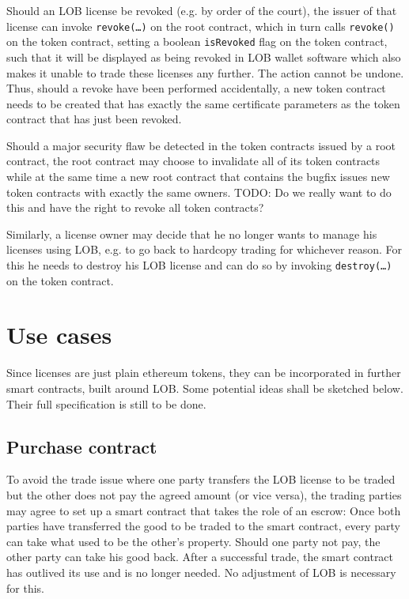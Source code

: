 \documentclass[a4paper]{article}
\newcommand{\todo}[1]{\textsf{TODO: #1}}
\begin{document}
Should an LOB license be revoked (e.g. by order of the court), the issuer of that license can invoke \texttt{revoke(…)} on the root contract, which in turn calls \texttt{revoke()} on the token contract, setting a boolean \texttt{isRevoked} flag on the token contract, such that it will be displayed as being revoked in LOB wallet software which also makes it unable to trade these licenses any further. The action cannot be undone. Thus, should a revoke have been performed accidentally, a new token contract needs to be created that has exactly the same certificate parameters as the token contract that has just been revoked.

Should a major security flaw be detected in the token contracts issued by a root contract, the root contract may choose to invalidate all of its token contracts while at the same time a new root contract that contains the bugfix issues new token contracts with exactly the same owners. \todo{Do we really want to do this and have the right to revoke all token contracts?}

Similarly, a license owner may decide that he no longer wants to manage his licenses using LOB, e.g. to go back to hardcopy trading for whichever reason. For this he needs to destroy his LOB license and can do so by invoking \texttt{destroy(…)} on the token contract.

\section{Use cases}
\label{ch:useCases}

Since licenses are just plain ethereum tokens, they can be incorporated in further smart contracts, built around LOB. Some potential ideas shall be sketched below. Their full specification is still to be done.

\subsection{Purchase contract}
\label{ch:purchaseContract}

To avoid the trade issue where one party transfers the LOB license to be traded but the other does not pay the agreed amount (or vice versa), the trading parties may agree to set up a smart contract that takes the role of an escrow: Once both parties have transferred the good to be traded to the smart contract, every party can take what used to be the other's property. Should one party not pay, the other party can take his good back. After a successful trade, the smart contract has outlived its use and is no longer needed. No adjustment of LOB is necessary for this.
\end{document}
